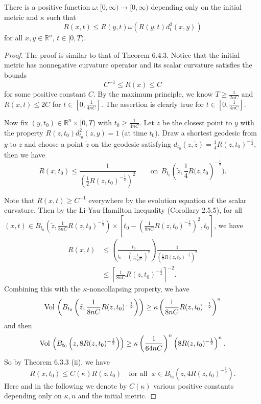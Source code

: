 \begin{lemma}
  \label{lem:cz-standard-solution-spatial-curvature-comparison}
There is a positive function
$\omega:[0,\infty)\rightarrow[0,\infty)$ depending only on the
initial metric and $\kappa$ such that
$$
  R(x,t)\leq R(y,t)\omega(R(y,t)d_{t}^{2}(x,y))
$$
for all $x,y\in \mathbb{R}^{n}$, $t\in[0,T)$.
\end{lemma}
\begin{proof}
The proof is similar to that of Theorem 6.4.3. Notice that the
initial metric has nonnegative curvature operator and its scalar
curvature satisfies the bounds \begin{equation}
C^{-1}\leqslant R(x)\leqslant C %
\end{equation} for some positive constant $C$. By the maximum principle, we
know $T\geq\frac{1}{2nC}$ and $R(x,t)\leq 2C$ for
$t\in[0,\frac{1}{4nC}]$. The assertion is clearly true for
$t\in[0,\frac{1}{4nC}]$.

Now fix $(y,t_{0})\in \mathbb{R}^{n}\times[0,T)$ with
$t_{0}\geq\frac{1}{4nC}$. Let $z$ be the closest point to $y$ with
the property $R(z,t_{0})d^{2}_{t_{0}}(z,y)=1$ (at time $t_{0}$).
Draw a shortest geodesic from $y$ to $z$ and choose a point
$\tilde{z}$ on the geodesic satisfying $d_{t_{0}}(z,\tilde{z})
=\frac{1}{4}R(z,t_{0})^{-\frac{1}{2}}$, then we have
$$
 R(x,t_{0})\leq\frac{1}{(\frac{1}{2}R(z,t_{0})^{-\frac{1}{2}})^{2}}
    \qquad \mbox{on}\ \
 B_{t_{0}}\left(\tilde{z},\frac{1}{4}R(z,t_{0}\right)^{-\frac{1}{2}}).
$$

Note that $R(x,t)\geqslant C^{-1}$ everywhere by the evolution
equation of the scalar curvature. Then by the Li-Yau-Hamilton
inequality (Corollary 2.5.5), for all $(x,t)\in
B_{t_{0}}(\tilde{z},\frac{1}{8nC}R(z,t_{0})^{-\frac{1}{2}})
\times[t_{0}-(\frac{1}{8nC}R(z,t_{0})^{-\frac{1}{2}})^{2},t_{0}]
$, we have
\begin{equation*}
\begin{split}
R(x,t)&  \leq \left(\frac{t_{0}}{t_{0}-\left(\frac{1}{8n\sqrt{C}}\right)^{2}}\right)
\frac{1}{\left(\frac{1}{2}R(z,t_{0})^{-\frac{1}{2}}\right)^{2}}\\
&  \leq \left[\frac{1}{8nC}R(z,t_{0})^{-\frac{1}{2}}\right]^{-2}.
\end{split}
\end{equation*}
Combining this with the $\kappa$-noncollapsing property, we have
$$
{\rm Vol}\,
\left(B_{t_{0}}\left(\tilde{z},\frac{1}{8nC}R(z,t_{0})^{-\frac{1}{2}}\right)\right)
\geq \kappa \left(\frac{1}{8nC}R(z,t_{0})^{-\frac{1}{2}}\right)^{n}
$$
and then
$$
{\rm Vol}\, \left(B_{t_{0}}\left(z,8R(z,t_{0})^{-\frac{1}{2}}\right)\right) \geq \kappa
\left(\frac{1}{64nC}\right)^{n}\left(8R(z,t_{0})^{-\frac{1}{2}}\right)^{n}.
$$
So by Theorem 6.3.3 (ii), we have
$$
R(x,t_{0})\leq C(\kappa)R(z,t_{0})\quad \text{for all }\; x\in
B_{t_{0}}\left(z,4R(z,t_{0})^{-\frac{1}{2}}\right).
$$
Here and in the following we denote by $C(\kappa)$ various
positive constants depending only on $\kappa,n$ and the initial
metric.


\end{proof}
